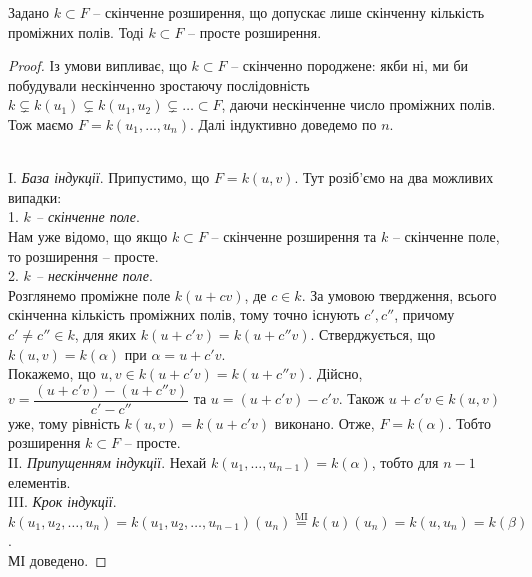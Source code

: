 \documentclass{math_library}
\begin{document}
\begin{proposition}
Задано $k \subset F$ -- скінченне розширення, що допускає лише скінченну кількість проміжних полів. Тоді $k \subset F$ -- просте розширення.
\end{proposition}

\begin{proof}
Із умови випливає, що $k \subset F$ -- скінченно породжене: якби ні, ми би побудували нескінченно зростаючу послідовність $k \subsetneq k(u_1) \subsetneq k(u_1,u_2) \subsetneq \dots \subset F$, даючи нескінченне число проміжних полів. Тож маємо $F = k(u_1,\dots,u_n)$. Далі індуктивно доведемо по $n$.

\bigskip \\
I. \textit{База індукції}. Припустимо, що $F = k(u,v)$. Тут розіб'ємо на два можливих випадки:\\
1. \textit{$k$ -- скінченне поле}.\\
Нам уже відомо, що якщо $k \subset F$ -- скінченне розширення та $k$ -- скінченне поле, то розширення -- просте.
\bigskip \\
2. \textit{$k$ -- нескінченне поле}.\\
Розглянемо проміжне поле $k(u+cv)$, де $c \in k$. За умовою твердження, всього скінченна кількість проміжних полів, тому точно існують $c',c''$, причому $c' \neq c'' \in k$, для яких $k(u+c'v) = k(u+c''v)$. Стверджується, що $k(u,v) = k(\alpha)$ при $\alpha = u + c'v$.\\
Покажемо, що $u,v \in k(u + c'v) = k(u + c''v)$. Дійсно, $v = \dfrac{(u+c'v) - (u+c''v)}{c'-c''}$ та $u = (u+c'v) - c'v$. Також $u + c'v \in k(u,v)$ уже, тому рівність $k(u,v) = k(u + c'v)$ виконано. Отже, $F = k(\alpha)$. Тобто розширення $k \subset F$ -- просте.
\bigskip \\
II. \textit{Припущенням індукції}. Нехай $k(u_1,\dots,u_{n-1}) = k(\alpha)$, тобто для $n-1$ елементів.\\
III. \textit{Крок індукції}. $k(u_1,u_2,\dots,u_n) = k(u_1,u_2,\dots,u_{n-1})(u_n) \overset{\text{MI}}{=} k(u)(u_n) = k(u,u_n) = k(\beta)$.\\
МІ доведено.
\end{proof}
\end{document}
